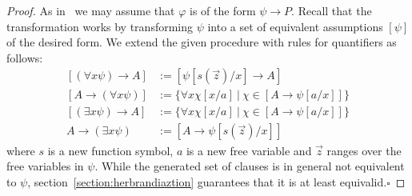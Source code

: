 \documentclass[runningheads]{llncs}
\begin{document}
\begin{proof}
	As in~\cite{otten2005clausal} we may assume that $\varphi$ is of the form $\psi\to P$. Recall that the transformation works by transforming $\psi$ into a set of equivalent assumptions $\left\lbrack \psi\right\rbrack$ of the desired form. We extend the given procedure with rules for quantifiers as follows:
	\begin{align*}
		\left\lbrack(\forall x \psi)\to A\right\rbrack&:= \left\lbrack\psi[s(\vec z)/x]\to A\right\rbrack\\
		\left\lbrack A\to (\forall x\psi)\right\rbrack&:= \{\forall x\chi[x/a]\:|\:\chi\in\left\lbrack A\to\psi[a/x]\right\rbrack\}\\
		\left\lbrack(\exists x\psi)\to A\right\rbrack&:= \{\forall x\chi[x/a]\:|\:\chi\in\left\lbrack A\to\psi[a/x]\right\rbrack\}\\
		A\to (\exists x\psi)&:= \left\lbrack A\to\psi[s(\vec z)/x]\right\rbrack
	\end{align*}
	where $s$ is a new function symbol, $a$ is a new free variable and $\vec z$ ranges over the free variables in $\psi$.
	While the generated set of clauses is in general not equivalent to $\psi$, section~\ref{section:herbrandiaztion} guarantees that it is at least equivalid.\hfill$\square$
\end{proof}
\end{document}
